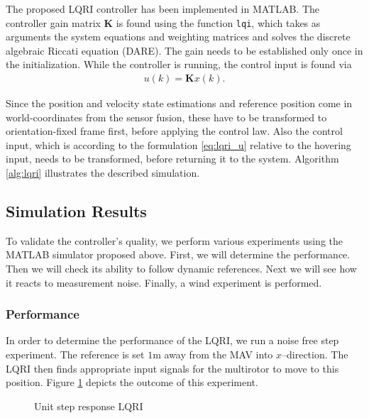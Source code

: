The proposed LQRI controller has been implemented in MATLAB. The controller gain matrix $\mathbf{K}$ is found using the function \texttt{lqi}, which takes as arguments the system equations and weighting matrices and solves the discrete algebraic Riccati equation (DARE). The gain needs to be established only once in the initialization. While the controller is running, the control input is found via
\begin{align}
u(k) = \mathbf{K} x(k).
\end{align}

Since the position and velocity state estimations and reference position come in world-coordinates from the sensor fusion, these have to be transformed to orientation-fixed frame first, before applying the control law. Also the control input, which is according to the formulation \ref{eq:lqri_u} relative to the hovering input, needs to be transformed, before returning it to the system. Algorithm \ref{alg:lqri} illustrates the described simulation.


\subsection{Simulation Results}
To validate the controller's quality, we perform various experiments using the MATLAB simulator proposed above. First, we will determine the performance. Then we will check its ability to follow dynamic references. Next we will see how it reacts to measurement noise. Finally, a wind experiment is performed.

\subsubsection{Performance}
In order to determine the performance of the LQRI, we run a noise free step experiment. The reference is set $1 \si{\metre}$ away from the MAV into $x$--direction. The LQRI then finds appropriate input signals for the multirotor to move to this position. Figure \ref{fig:lqri_step} depicts the outcome of this experiment.
\begin{figure}
\centering
{}
\qquad
{}
\caption{Unit step response LQRI}
\label{fig:lqri_step}
\end{figure}

